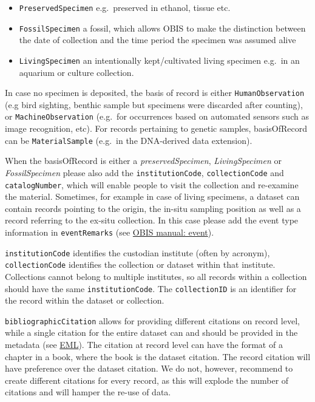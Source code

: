 \documentclass[
  letterpaper,
  DIV=11,
  numbers=noendperiod,
  oneside]{scrreprt}
\providecommand{\tightlist}{%
  \setlength{\itemsep}{0pt}\setlength{\parskip}{0pt}}\usepackage{longtable,booktabs,array}
\begin{document}
\begin{itemize}
\tightlist
\item
  \texttt{PreservedSpecimen} e.g.~preserved in ethanol, tissue etc.
\item
  \texttt{FossilSpecimen} a fossil, which allows OBIS to make the
  distinction between the date of collection and the time period the
  specimen was assumed alive
\item
  \texttt{LivingSpecimen} an intentionally kept/cultivated living
  specimen e.g.~in an aquarium or culture collection.
\end{itemize}

In case no specimen is deposited, the basis of record is either
\texttt{HumanObservation} (e.g bird sighting, benthic sample but
specimens were discarded after counting), or \texttt{MachineObservation}
(e.g.~for occurrences based on automated sensors such as image
recognition, etc). For records pertaining to genetic samples,
basisOfRecord can be \texttt{MaterialSample} (e.g.~in the DNA-derived
data extension).

When the basisOfRecord is either a \emph{preservedSpecimen},
\emph{LivingSpecimen} or \emph{FossilSpecimen} please also add the
\texttt{institutionCode}, \texttt{collectionCode} and
\texttt{catalogNumber}, which will enable people to visit the collection
and re-examine the material. Sometimes, for example in case of living
specimens, a dataset can contain records pointing to the origin, the
in-situ sampling position as well as a record referring to the ex-situ
collection. In this case please add the event type information in
\texttt{eventRemarks} (see \protect\hyperlink{event}{OBIS manual:
event}).

\texttt{institutionCode} identifies the custodian institute (often by
acronym), \texttt{collectionCode} identifies the collection or dataset
within that institute. Collections cannot belong to multiple institutes,
so all records within a collection should have the same
\texttt{institutionCode}. The \texttt{collectionID} is an identifier for
the record within the dataset or collection.

\texttt{bibliographicCitation} allows for providing different citations
on record level, while a single citation for the entire dataset can and
should be provided in the metadata (see \href{eml.html}{EML}). The
citation at record level can have the format of a chapter in a book,
where the book is the dataset citation. The record citation will have
preference over the dataset citation. We do not, however, recommend to
create different citations for every record, as this will explode the
number of citations and will hamper the re-use of data.
\end{document}
